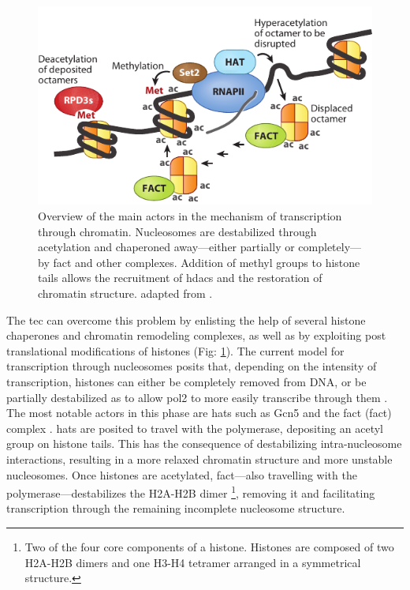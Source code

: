 \begin{figure}[ht]

\centering
\includegraphics[width=\textwidth]{figures/introduction/nucTranscription}
\caption[Mechanism of transcription through chromatin.]{Overview of the main actors in the mechanism of transcription through chromatin.
Nucleosomes are destabilized through acetylation and chaperoned away---either partially or completely---by \gls{fact} and other complexes.
Addition of methyl groups to histone tails allows the recruitment of \gls{hdacs} and the restoration of chromatin structure.
adapted from \citep{selth:2010:transcript}. }
\label{fig:nucTranscription}

\end{figure}

The \gls{tec} can overcome this problem by enlisting the help of several histone chaperones and chromatin remodeling complexes, as well as by exploiting post translational modifications of histones (Fig: \ref{fig:nucTranscription}). 
The current model for transcription through nucleosomes posits that, depending on the intensity of transcription, histones can either be completely removed from DNA, or be partially destabilized as to allow \gls{pol2} to more easily transcribe through them \citep{kulaeva:2013:mechanism}.
The most notable actors in this phase are \gls{hats} such as Gcn5 and the \gls{fact} (\glsdesc{fact}) complex \citep[for review see:][]{reinberg:2006:de}. 
\gls{hats} are posited to travel with the polymerase, depositing an acetyl group on histone tails.
This has the consequence of destabilizing intra-nucleosome interactions, resulting in a more relaxed chromatin structure and more unstable nucleosomes.
Once histones are acetylated, \gls{fact}---also travelling with the polymerase---destabilizes the H2A-H2B dimer \footnote{
Two of the four core components of a histone. Histones are composed of two H2A-H2B dimers and one H3-H4 tetramer arranged in a symmetrical structure. 
}, removing it and facilitating transcription through the remaining incomplete nucleosome structure. 

